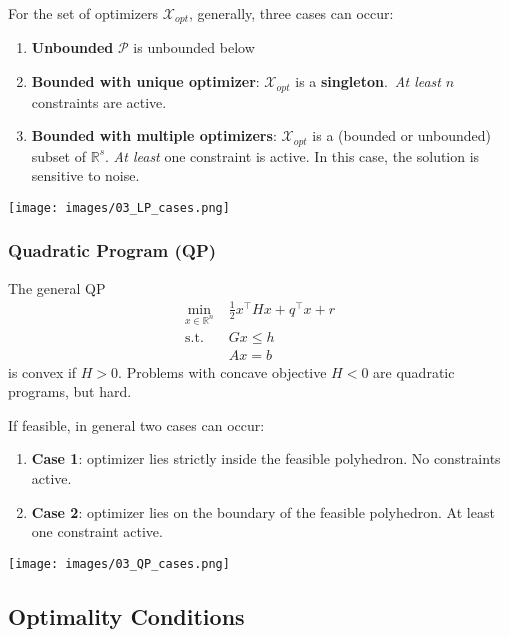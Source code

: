 \newpar{}
For the set of optimizers $\mathcal{X}_{opt}$, generally, three cases can occur:
\begin{enumerate}
    \item \textbf{Unbounded} $\mathcal{P}$ is unbounded below
    \item \textbf{Bounded with unique optimizer}: $\mathcal{X}_{opt}$ is a \textbf{singleton}.\ \textit{At least} $n$ constraints are active.
    \item \textbf{Bounded with multiple optimizers}: $\mathcal{X}_{opt}$ is a (bounded or unbounded) subset of $\mathbb{R}^s$. \textit{At least} one constraint is active. In this case, the solution is sensitive to noise. %
\end{enumerate}
\begin{center}
    \texttt{[image: images/03\_LP\_cases.png]}
\end{center}

\subsubsection{Quadratic Program (QP)}\label{optimizer_location_QP}
The general QP
\begin{align*}
    \min_{x\in\mathbb{R}^n}\; & \frac{1}{2}x^\top H x + q^\top x + r \\
    \mathrm{s.t.}\;           & Gx \leq h                            \\
                              & Ax = b
\end{align*}
is convex if $H>0$.
\newpar{}
Problems with concave objective $H<0$ are quadratic programs, but hard.

\newpar{}
If feasible, in general two cases can occur:
\begin{enumerate}
    \item \textbf{Case 1}: optimizer lies strictly inside the feasible polyhedron. No constraints active.
    \item \textbf{Case 2}: optimizer lies on the boundary of the feasible polyhedron. At least one constraint active.
\end{enumerate}
\begin{center}
    \texttt{[image: images/03\_QP\_cases.png]}
\end{center}

\subsection{Optimality Conditions}

